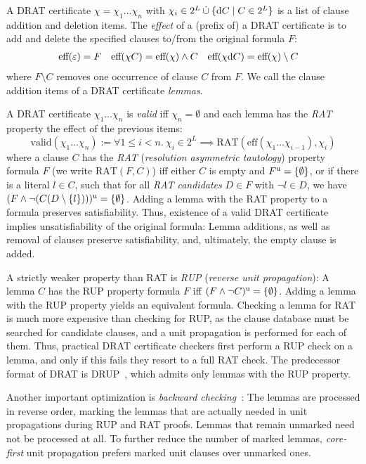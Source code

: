 \documentclass{llncs}
\begin{document}
A DRAT certificate $\chi = \chi_1\ldots\chi_n$ with $\chi_i \in 2^L \mathbin{\dot\cup} \{ \textrm d C \mid C\in 2^L \}$
is a list of clause addition and deletion items.
The \emph{effect} of a (prefix of) a DRAT certificate is to add and delete the specified clauses to/from the original formula $F$:
\begin{align*}
  \textrm{eff}(\varepsilon) &= F&
  \textrm{eff}(\chi C) &= \textrm{eff}(\chi) \wedge C&
  \textrm{eff}(\chi\textrm d C) &= \textrm{eff}(\chi) \setminus C
\end{align*}
where $F \setminus C$ removes one occurrence of clause $C$ from $F$. %
We call the clause addition items of a DRAT certificate \emph{lemmas}.

A DRAT certificate $\chi_1 \ldots \chi_n$ is \emph{valid} iff $\chi_n=\emptyset$ and each lemma has the \emph{RAT} property \wrt the effect of the previous items:
\[
  \textrm{valid}(\chi_1 \ldots \chi_n) := \forall 1\le i<n.~\chi_i\in2^L \implies\textrm{RAT}( \textrm{eff}(\chi_1\ldots \chi_{i-1}), \chi_i )
\]
where a clause $C$ has the \emph{RAT} (\emph{resolution asymmetric tautology}) property \wrt formula $F$ (we write $\textrm{RAT}(F,C)$) iff either $C$ is empty and $F^{\textrm u}=\{\emptyset\}$,
or if there is a literal $l\in C$, such that for all \emph{RAT candidates} $D\in F$ with $\neg l \in D$, we have $(F \wedge \neg(C(D\setminus\{l\})))^{\textrm u} = \{\emptyset\}$.
Adding a lemma with the RAT property to a formula preserves satisfiability. Thus, existence of a valid DRAT certificate implies unsatisfiability of the original formula: Lemma additions, as well as removal of clauses preserve satisfiability, and, ultimately, the empty clause is added.

A strictly weaker property than RAT is \emph{RUP} (\emph{reverse unit propagation}): A lemma $C$ has the RUP property \wrt formula $F$ iff $(F \wedge \neg C)^{\textrm u} = \{\emptyset\}$.
Adding a lemma with the RUP property yields an equivalent formula.
Checking a lemma for RAT is much more expensive than checking for RUP, as the clause database must be searched for candidate clauses,
and a unit propagation is performed for each of them. Thus, practical DRAT certificate checkers first perform a RUP check on a lemma, and only if 
this fails they resort to a full RAT check. The predecessor format of DRAT is DRUP~\cite{HHW13}, which admits only lemmas with the RUP property.

Another important optimization is \emph{backward checking}~\cite{GoNo03,HHW13}: The lemmas are processed in reverse order, marking the lemmas that are actually needed 
in unit propagations during RUP and RAT proofs. Lemmas that remain unmarked need not be processed at all. To further reduce the number of marked lemmas, 
\emph{core-first} unit propagation prefers marked unit clauses over unmarked ones.
\end{document}
